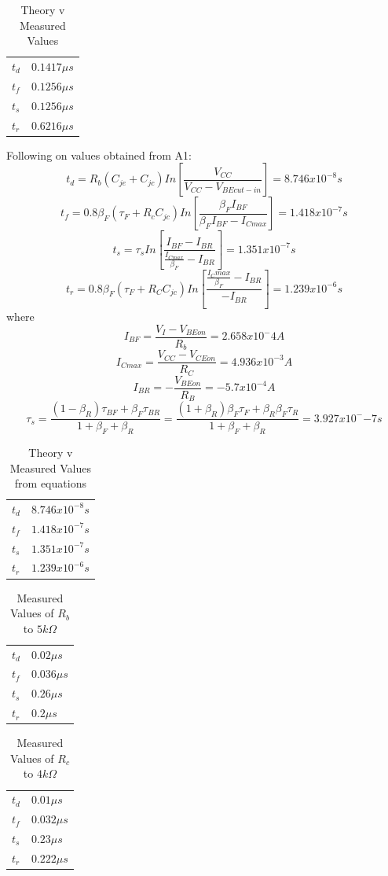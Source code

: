 \documentclass[12pt]{article}
\begin{document}
\begin{table}[h]
\centering
\begin{tabular}{ll}
$t_d$ & $0.1417\mu s$\\
$t_f$ & $0.1256\mu s$\\
$t_s$ & $0.1256\mu s$\\
$t_r$ & $0.6216\mu s$
\end{tabular}
\caption{Theory v Measured Values}
\end{table}
Following on values obtained from A1:
$$t_d=R_b\left(C_{je}+C_{jc}\right)In\left[\frac{V_{CC}}{V_{CC}-V_{BE cut-in}}\right]=8.746x10^{-8}s$$
$$t_f=0.8\beta_F\left(\tau_F+R_cC_{jc}\right)In\left[\frac{\beta_FI_{BF}}{\beta_FI_{BF}-I_{C max}}\right]=1.418x10^{-7}s$$
$$t_s=\tau_sIn\left[\frac{I_{BF}-I_{BR}}{\frac{I_{C max}}{\beta_F}-I_{BR}}\right]=1.351x10^{-7}s$$
$$t_r=0.8\beta_F\left(\tau_F+R_CC_{jc}\right)In\left[\frac{\frac{I_C max}{\beta_F}-I_{BR}}{-I_{BR}}\right]=1.239x10^{-6}s$$
where
$$I_{BF}=\frac{V_I-V_{BE on}}{R_b}=2.658x10^-4A$$
$$I_{C max}=\frac{V_{CC}-V_{CE on}}{R_C}=4.936x10^{-3}A$$
$$I_{BR}=-\frac{V_{BE on}}{R_B}=-5.7x10^{-4}A$$
$$\tau_s=\frac{(1-\beta_R)\tau_{BF}+\beta_F\tau_{BR}}{1+\beta_F+\beta_R}=\frac{(1+\beta_R)\beta_F\tau_F+\beta_R\beta_F\tau_R}{1+\beta_F+\beta_R}=3.927x10^-{-7}s$$
\begin{table}[!h]
\centering
\begin{tabular}{ll}
$t_d$ & $8.746x10^{-8}s$\\
$t_f$ & $1.418x10^{-7}s$\\
$t_s$ & $1.351x10^{-7}s$\\
$t_r$ & $1.239x10^{-6}s$
\end{tabular}
\caption{Theory v Measured Values from equations}
\end{table}
\begin{table}[!h]
\centering
\begin{tabular}{ll}
$t_d$ & $0.02\mu s$\\
$t_f$ & $0.036\mu s$\\
$t_s$ & $0.26\mu s$\\
$t_r$ & $0.2\mu s$
\end{tabular}
\caption{Measured Values of $R_b$ to $5k\Omega$}
\end{table}
\begin{table}[!h]
\centering
\begin{tabular}{ll}
$t_d$ & $0.01\mu s$\\
$t_f$ & $0.032\mu s$\\
$t_s$ & $0.23\mu s$\\
$t_r$ & $0.222\mu s$
\end{tabular}
\caption{Measured Values of $R_c$ to $4k\Omega$}
\end{table}
\end{document}
